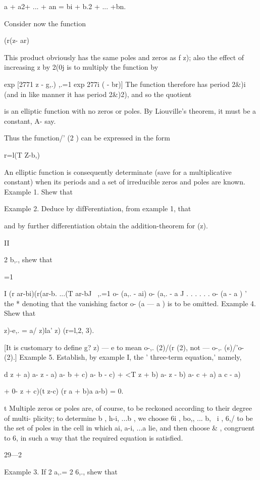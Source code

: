 {a + a2+ ... + an = bi + b.2 + ... +bn.

Consider now the function

  (r(z- ar)

This product obviously has the same poles and zeros as f z); also the
effect of increasing z by 2(0j is to multiply the function by

  exp [2771 z - g,.) ,.=1 exp 277i ( - br)] The function therefore has
period 2\&)i (and in like manner it has period 2\&)2), and so the
quotient

is an elliptic function with no zeros or poles. By Liouville's
theorem, it must be a constant, A- say.

Thus the function/' (2 ) can be expressed in the form

r=l(T Z-b,)

An elliptic function is consequently determinate (save for a
multiplicative constant) when its periods and a set of irreducible
zeros and poles are known. Example 1. Shew that

Example 2. Deduce by difFerentiation, from example 1, that

and by further differentiation obtain the addition-theorem for (z).

II

2 b,., shew that

=1

I (r ar-bi)(r(ar-b. ...(T ar-bJ \ ,.=1 o- (a,. - ai) o- (a,. - a J . .
. . . . o- (a - a ) ' the * denoting that the vanishing factor o- (a —
a ) is to be omitted. Example 4. Shew that

  z)-e,. = a/ z)la' z) (r=l,2, 3).

[It is customary to define g? z) — e to mean o-,. (2)/(r (2), not —
o-,. (s)/'o- (2).] Example 5. Establish, by example I, the '
three-term equation,' namely,

d z + a) a- z - a) a- b + c) a- b - c) + <T z + b) a- z - b) a- c + a)
a c - a)

+ 0- z + c)(t z-c) (r a + b)a a-b) = 0.

t Multiple zeros or poles are, of course, to be reckoned according to
their degree of multi- plicity; to determine b , h-i, ...b , we
choose 6i , bo,, ... b, \ i , 6,/ to be the set of poles in the cell
in which ai, a-i, ...a lie, and then choose \& , congruent to 6, in
such a way that the required equation is satisfied.

29—2

Example 3. If 2 a,.= 2 6,., shew that

}
